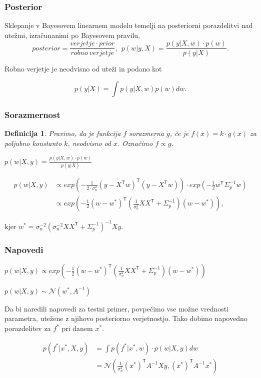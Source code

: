 \documentclass{beamer}
\newtheorem{proposition}[theorem]{Definicija}
\begin{document}
\begin{frame}

\frametitle{Posterior}
Sklepanje v Bayesovem linearnem modelu temelji na posteriorni porazdelitvi nad utežmi, izračunanimi po Bayesovem pravilu,
\begin{equation} 
posterior = \frac{verjetje \cdot prior}{robno~verjetje},   ~~  p(w|y,X) = \frac{p(y|X,w) \cdot p(w)}{p(y|X)}.
\end{equation}

Robno verjetje je neodvisno od uteži in podano kot

\begin{equation}
p(y|X) = \int p(y|X,w) p(w) dw.
\end{equation}

\end{frame}

\begin{frame}

\frametitle{Sorazmernost}

\begin{proposition} Pravimo, da je funkcija $f$ \alert{sorazmerna} $g$, če je $f(x)=k \cdot g(x)$ za poljubno konstanto $k$, neodvisno od $x$. Označimo $ f \propto g$.
\end{proposition}

$ p(w|X,y) = \frac{p(y|X,w) \cdot p(w)}{p(y|X)} $

\begin{equation}
\begin{split}
p(w| X,y) & \propto exp ( - \frac{1}{2 \cdot \sigma_{n}^2}( y- X^\mathsf{T} w)^\mathsf{T} (y - X^\mathsf{T} w)) \cdot exp(- \frac{1}{2} w^\mathsf{T} \Sigma_{p}^{-1}w) \\
& \propto exp (- \frac{1}{2}(w - w^*)^\mathsf{T} (\frac{1}{ \sigma_{n}^2} X X^\mathsf{T} + \Sigma_{p}^{-1}) (w-w^*)),
\end{split}
\end{equation}

kjer $w^* =  \sigma_{n}^{-2} (  \sigma_{n}^{-2} X X^\mathsf{T} + \Sigma_{p}^{-1})^{-1}Xy$. 

\end{frame}
\begin{frame}
\frametitle{Napovedi}
$ p(w| X,y) \propto exp (- \frac{1}{2}(w - w^*)^\mathsf{T} (\frac{1}{ \sigma_{n}^2} X X^\mathsf{T} + \Sigma_{p}^{-1}) (w-w^*)) $

$p(w |X,y) \sim \mathcal{N}(w^*, A^{-1})$


Da bi naredili napovedi za testni primer, povpečimo vse možne vrednosti parametra, utežene z njihovo posteriorno verjetnostjo.
Tako dobimo napovedno porazdelitev za $ f^{*}$ pri danem $x^{*}$.

\begin{equation}
\begin{split}
 p( f^* | x^*, X,y) &= \int p(f^* | x^*, w) \cdot p(w| X, y) dw  \\
 &= \mathcal{N}(\frac{1}{ \sigma_{n}^2} (x^*)^\mathsf{T} A^{-1} X y, (x^*)^\mathsf{T} A^{-1} x^*) 
 \end{split}
\end{equation}

\end{frame}
\end{document}
